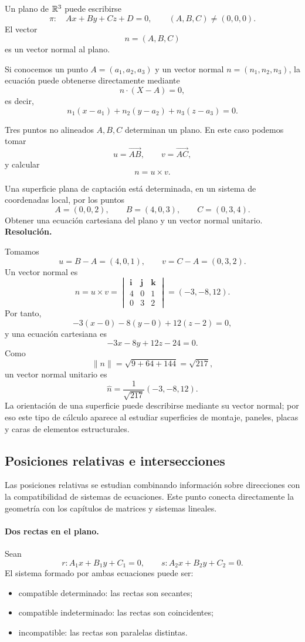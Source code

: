 \begin{definition}
Un plano de $\mathbb{R}^3$ puede escribirse
\[
\pi:\quad Ax+By+Cz+D=0,
\qquad (A,B,C)\neq(0,0,0).
\]
El vector
\[
n=(A,B,C)
\]
es un vector normal al plano.
\end{definition}

Si conocemos un punto $A=(a_1,a_2,a_3)$ y un vector normal $n=(n_1,n_2,n_3)$, la ecuación puede obtenerse directamente mediante
\[
n\cdot(X-A)=0,
\]
es decir,
\[
n_1(x-a_1)+n_2(y-a_2)+n_3(z-a_3)=0.
\]

Tres puntos no alineados $A,B,C$ determinan un plano. En este caso podemos tomar
\[
u=\overrightarrow{AB},
\qquad
v=\overrightarrow{AC},
\]
y calcular
\[
n=u\times v.
\]

\begin{solvedexercise}
Una superficie plana de captación está determinada, en un sistema de coordenadas local, por los puntos
\[
A=(0,0,2),\qquad B=(4,0,3),\qquad C=(0,3,4).
\]
Obtener una ecuación cartesiana del plano y un vector normal unitario.
\tcblower
\textbf{Resolución.}\par\smallskip
Tomamos
\[
u=B-A=(4,0,1),
\qquad
v=C-A=(0,3,2).
\]
Un vector normal es
\[
n=u\times v
=
\begin{vmatrix}
\mathbf i&\mathbf j&\mathbf k\\
4&0&1\\
0&3&2
\end{vmatrix}
=(-3,-8,12).
\]
Por tanto,
\[
-3(x-0)-8(y-0)+12(z-2)=0,
\]
y una ecuación cartesiana es
\[
\boxed{-3x-8y+12z-24=0.}
\]
Como
\[
\|n\|=\sqrt{9+64+144}=\sqrt{217},
\]
un vector normal unitario es
\[
\boxed{\widehat n=\frac1{\sqrt{217}}(-3,-8,12).}
\]
La orientación de una superficie puede describirse mediante su vector normal; por eso este tipo de cálculo aparece al estudiar superficies de montaje, paneles, placas y caras de elementos estructurales.
\end{solvedexercise}

\subsection{Posiciones relativas e intersecciones}

Las posiciones relativas se estudian combinando información sobre direcciones con la compatibilidad de sistemas de ecuaciones. Este punto conecta directamente la geometría con los capítulos de matrices y sistemas lineales.

\paragraph{Dos rectas en el plano.}
Sean
\[
r:A_1x+B_1y+C_1=0,
\qquad
s:A_2x+B_2y+C_2=0.
\]
El sistema formado por ambas ecuaciones puede ser:
\begin{itemize}
\item compatible determinado: las rectas son secantes;
\item compatible indeterminado: las rectas son coincidentes;
\item incompatible: las rectas son paralelas distintas.
\end{itemize}

